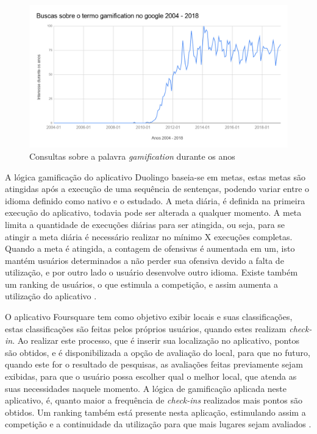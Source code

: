 \begin{figure}[H]
    \centering
    \includegraphics[scale=0.4]{src/imagens/cap1/gamification-google-trends.png}
    \caption{Consultas sobre a palavra \textit{gamification} durante os anos}
    \label{fig:gamification-google-trends}
\end{figure}

\par A lógica gamificação do aplicativo Duolingo baseia-se em metas, estas metas são atingidas após a execução de uma sequência de sentenças, podendo variar entre o idioma definido como nativo e o estudado. A meta diária, é definida na primeira execução do aplicativo, todavia pode ser alterada a qualquer momento. A meta limita a quantidade de execuções diárias para ser atingida, ou seja, para se atingir a meta diária é necessário realizar no mínimo X execuções completas. Quando a meta é atingida, a contagem de ofensivas é aumentada em um, isto mantém usuários determinados a não perder sua ofensiva devido a falta de utilização, e por outro lado o usuário desenvolve outro idioma. Existe também um ranking de usuários, o que estimula a competição, e assim aumenta a utilização do aplicativo \cite{melo2016eficiencia}.

\par O aplicativo Foursquare tem como objetivo exibir locais e suas classificações, estas classificações são feitas pelos próprios usuários, quando estes realizam \textit{check-in}. Ao realizar este processo, que é inserir sua localização no aplicativo, pontos são obtidos, e é disponibilizada a opção de avaliação do local, para que no futuro, quando este for o resultado de pesquisas, as avaliações feitas previamente sejam exibidas, para que o usuário possa escolher qual o melhor local, que atenda as suas necessidades naquele momento. A lógica de gamificação aplicada neste aplicativo, é, quanto maior a frequência de \textit{check-ins} realizados mais pontos são obtidos. Um ranking também está presente nesta aplicação, estimulando assim a competição e a continuidade da utilização para que mais lugares sejam avaliados \cite{huotari2012defining}.

